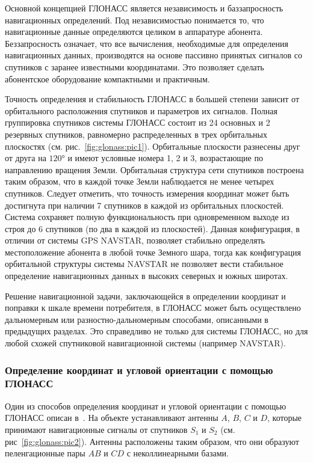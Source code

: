 \documentclass[../main.tex]{subfiles}
\begin{document}
Основной концепцией ГЛОНАСС является независимость и баззапросность навигационных определений. Под независимостью понимается то, что навигационные данные определяются целиком в аппаратуре абонента. Беззапросность означает, что все вычисления, необходимые для определения навигационных данных, производятся на основе пассивно принятых сигналов со спутников с заранее известными координатами. Это позволяет сделать абонентское оборудование компактными и практичным.

Точность определения и стабильность ГЛОНАСС в большей степени зависит от орбитального расположения спутников и параметров их сигналов. Полная группировка спутников системы ГЛОНАСС состоит из 24 основных и 2 резервных спутников, равномерно распределенных в трех орбитальных плоскостях (см. рис.~\ref{fig:glonass:pic1}). Орбитальные плоскости разнесены друг от друга на $\ang{120}$ и имеют условные номера 1, 2 и 3, возрастающие по направлению вращения Земли. Орбитальная структура сети спутников построена таким образом, что в каждой точке Земли наблюдается не менее четырех спутников. Следует отметить, что точность измерения координат может быть достигнута при наличии 7 спутников в каждой из орбитальных плоскостей. Система сохраняет полную функциональность при одновременном выходе из строя до 6 спутников (по два в каждой из плоскостей). Данная конфигурация, в отличии от системы GPS NAVSTAR, позволяет стабильно определять местоположение абонента в любой точке Земного шара, тогда как конфигурация орбитальной структуры системы NAVSTAR не позволяет вести стабильное определение навигационных данных в высоких северных и южных широтах.

Решение навигационной задачи, заключающейся в определении координат и поправки к шкале времени потребителя, в ГЛОНАСС может быть осуществлено дальномерным или разностно-дальномерным способами, описанными в предыдущих разделах. Это справедливо не только для системы ГЛОНАСС, но для любой схожей спутниковой навигационной системы (например NAVSTAR).

\subsubsection{Определение координат и угловой ориентации с помощью ГЛОНАСС}
Один из способов определения координат и угловой ориентации с помощью ГЛОНАСС описан в~\cite{STEPANOV:2006}. На объекте устанавливают антенны $A$, $B$, $C$ и $D$, которые принимают навигационные сигналы от спутников $S_1$ и $S_2$ (см. рис~\ref{fig:glonass:pic2}). Антенны расположены таким образом, что они образуют пеленгационные пары $AB$ и $CD$ с неколлинеарными базами.
\end{document}
